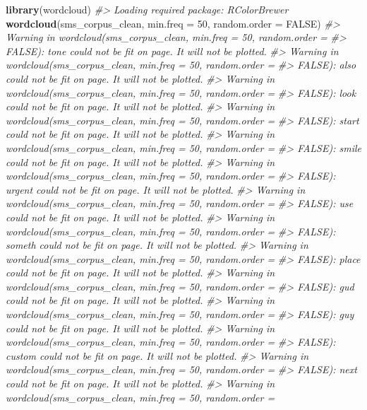 \documentclass[]{book}
\newenvironment{Shaded}{\begin{snugshade}}{\end{snugshade}}
\newcommand{\CommentTok}[1]{\textcolor[rgb]{0.56,0.35,0.01}{\textit{#1}}}
\newcommand{\DataTypeTok}[1]{\textcolor[rgb]{0.13,0.29,0.53}{#1}}
\newcommand{\DecValTok}[1]{\textcolor[rgb]{0.00,0.00,0.81}{#1}}
\newcommand{\KeywordTok}[1]{\textcolor[rgb]{0.13,0.29,0.53}{\textbf{#1}}}
\newcommand{\NormalTok}[1]{#1}
\newcommand{\OtherTok}[1]{\textcolor[rgb]{0.56,0.35,0.01}{#1}}
\begin{document}
\begin{Shaded}
\begin{Highlighting}[]
\KeywordTok{library}\NormalTok{(wordcloud)}
\CommentTok{#> Loading required package: RColorBrewer}
\KeywordTok{wordcloud}\NormalTok{(sms_corpus_clean, }\DataTypeTok{min.freq =} \DecValTok{50}\NormalTok{, }\DataTypeTok{random.order =} \OtherTok{FALSE}\NormalTok{)}
\CommentTok{#> Warning in wordcloud(sms_corpus_clean, min.freq = 50, random.order =}
\CommentTok{#> FALSE): tone could not be fit on page. It will not be plotted.}
\CommentTok{#> Warning in wordcloud(sms_corpus_clean, min.freq = 50, random.order =}
\CommentTok{#> FALSE): also could not be fit on page. It will not be plotted.}
\CommentTok{#> Warning in wordcloud(sms_corpus_clean, min.freq = 50, random.order =}
\CommentTok{#> FALSE): look could not be fit on page. It will not be plotted.}
\CommentTok{#> Warning in wordcloud(sms_corpus_clean, min.freq = 50, random.order =}
\CommentTok{#> FALSE): start could not be fit on page. It will not be plotted.}
\CommentTok{#> Warning in wordcloud(sms_corpus_clean, min.freq = 50, random.order =}
\CommentTok{#> FALSE): smile could not be fit on page. It will not be plotted.}
\CommentTok{#> Warning in wordcloud(sms_corpus_clean, min.freq = 50, random.order =}
\CommentTok{#> FALSE): urgent could not be fit on page. It will not be plotted.}
\CommentTok{#> Warning in wordcloud(sms_corpus_clean, min.freq = 50, random.order =}
\CommentTok{#> FALSE): use could not be fit on page. It will not be plotted.}
\CommentTok{#> Warning in wordcloud(sms_corpus_clean, min.freq = 50, random.order =}
\CommentTok{#> FALSE): someth could not be fit on page. It will not be plotted.}
\CommentTok{#> Warning in wordcloud(sms_corpus_clean, min.freq = 50, random.order =}
\CommentTok{#> FALSE): place could not be fit on page. It will not be plotted.}
\CommentTok{#> Warning in wordcloud(sms_corpus_clean, min.freq = 50, random.order =}
\CommentTok{#> FALSE): gud could not be fit on page. It will not be plotted.}
\CommentTok{#> Warning in wordcloud(sms_corpus_clean, min.freq = 50, random.order =}
\CommentTok{#> FALSE): guy could not be fit on page. It will not be plotted.}
\CommentTok{#> Warning in wordcloud(sms_corpus_clean, min.freq = 50, random.order =}
\CommentTok{#> FALSE): custom could not be fit on page. It will not be plotted.}
\CommentTok{#> Warning in wordcloud(sms_corpus_clean, min.freq = 50, random.order =}
\CommentTok{#> FALSE): next could not be fit on page. It will not be plotted.}
\CommentTok{#> Warning in wordcloud(sms_corpus_clean, min.freq = 50, random.order =}

\end{Highlighting}
\end{Shaded}
\end{document}
